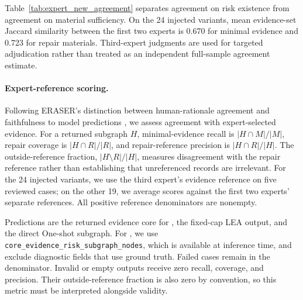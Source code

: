 \begin{revadded}
Table~\ref{tab:expert_new_agreement} separates agreement on risk existence from agreement on material sufficiency. On the 24 injected variants, mean evidence-set Jaccard similarity between the first two experts is 0.670 for minimal evidence and 0.723 for repair materials. Third-expert judgments are used for targeted adjudication rather than treated as an independent full-sample agreement estimate.

\paragraph{Expert-reference scoring.}
Following ERASER's distinction between human-rationale agreement and faithfulness to model predictions \citep{deyoung2020eraser}, we assess agreement with expert-selected evidence. For a returned subgraph $H$, minimal-evidence recall is $|H\cap M|/|M|$, repair coverage is $|H\cap R|/|R|$, and repair-reference precision is $|H\cap R|/|H|$. The outside-reference fraction, $|H\setminus R|/|H|$, measures disagreement with the repair reference rather than establishing that unreferenced records are irrelevant. For the 24 injected variants, we use the third expert's evidence reference on five reviewed cases; on the other 19, we average scores against the first two experts' separate references. All positive reference denominators are nonempty.

Predictions are the returned evidence core for \samcgs{}, the fixed-cap LEA output, and the direct One-shot subgraph. For \samcgs{}, we use \texttt{core\_evidence\_risk\_subgraph\_nodes}, which is available at inference time, and exclude diagnostic fields that use ground truth. Failed cases remain in the denominator. Invalid or empty outputs receive zero recall, coverage, and precision. Their outside-reference fraction is also zero by convention, so this metric must be interpreted alongside validity.

\end{revadded}

